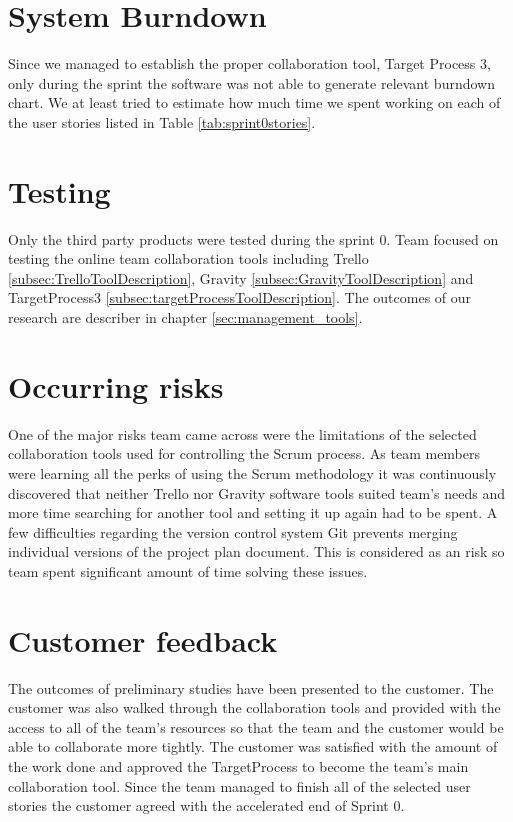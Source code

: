 \section{System Burndown}
Since we managed to establish the proper collaboration tool, Target Process 3, only during the sprint the software was not able to generate relevant burndown chart.
We at least tried to estimate how much time we spent working on each of the user stories listed in Table \ref{tab:sprint0stories}.

\section{Testing}

Only the third party products were tested during the sprint 0. Team focused on testing the online team collaboration tools including Trello \ref{subsec:TrelloToolDescription}, Gravity \ref{subsec:GravityToolDescription} and TargetProcess3 \ref{subsec:targetProcessToolDescription}. The outcomes of our research are describer in chapter \ref{sec:management_tools}.

\section{Occurring risks}

One of the major risks team came across were the limitations of the selected collaboration tools used for controlling the Scrum process. As team members were learning all the perks of using the Scrum methodology it was continuously discovered that neither Trello nor Gravity software tools suited team's needs and more time searching for another tool and setting it up again had to be spent. A few difficulties regarding the version control system Git prevents merging individual versions of the project plan document. This is considered as an risk so team spent significant amount of time solving these issues.

\section{Customer feedback}

The outcomes of preliminary studies have been presented to the customer. The customer was also walked through the collaboration tools and provided with the access to all of the team's resources so that the team and the customer would be able to collaborate more tightly. The customer was satisfied with the amount of the work done and approved the TargetProcess to become the team's main collaboration tool. Since the team managed to finish all of the selected user stories the customer agreed with the accelerated end of Sprint 0.


